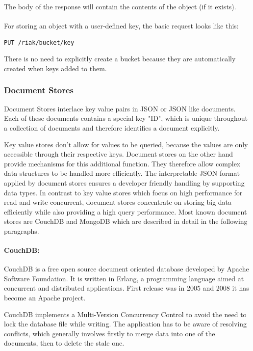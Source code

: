 The body of the response will contain the contents of the object (if it exists).
\\
\\
For storing an object with a user-defined key, the basic request looks like this:

\begin{code}
\begin{verbatim}
PUT /riak/bucket/key
\end{verbatim}
\label{lst:riak_get}
\end{code}

There is no need to explicitly create a bucket because they are automatically created when keys added to them.


\subsubsection{Document Stores}
Document Stores interlace key value pairs in JSON or JSON like documents. Each of these documents contains a special key "ID", which is unique throughout a collection of documents and therefore identifies a document explicitly. 

Key value stores don't allow for values to be queried, because the values are only accessible through their respective keys. Document stores on the other hand provide mechanisms for this additional function. They therefore allow complex data structures to be handled more efficiently. The interpretable JSON format applied by document stores ensures a developer friendly handling by supporting data types. In contrast to key value stores which focus on high performance for read and write concurrent, document stores concentrate on storing big data efficiently while also providing a high query performance. Most known document stores are CouchDB and MongoDB  which are described in detail in the following paragraphs.

\paragraph{CouchDB:} CouchDB is a free open source document oriented database developed by Apache Software Foundation. It is written in Erlang, a programming language aimed at concurrent and distributed applications. First release was in 2005 and 2008 it has become an Apache project.

CouchDB implements a Multi-Version Concurrency Control to avoid the need to lock the database file while writing. The application has to be aware of resolving conflicts, which generally involves firstly to merge data into one of the documents, then to delete the stale one.

